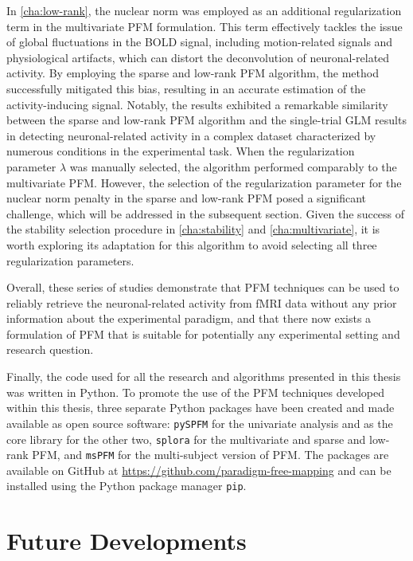 In \cref{cha:low-rank}, the nuclear norm was employed as an additional
regularization term in the multivariate PFM formulation. This term effectively
tackles the issue of global fluctuations in the BOLD signal, including
motion-related signals and physiological artifacts, which can distort the
deconvolution of neuronal-related activity. By employing the sparse and low-rank
PFM algorithm, the method successfully mitigated this bias, resulting in an
accurate estimation of the activity-inducing signal. Notably, the results
exhibited a remarkable similarity between the sparse and low-rank PFM algorithm
and the single-trial GLM results in detecting neuronal-related activity in a
complex dataset characterized by numerous conditions in the experimental task.
When the regularization parameter $\lambda$ was manually selected, the algorithm
performed comparably to the multivariate PFM. However, the selection of the
regularization parameter for the nuclear norm penalty in the sparse and low-rank
PFM posed a significant challenge, which will be addressed in the subsequent
section. Given the success of the stability selection procedure in
\cref{cha:stability} and \cref{cha:multivariate}, it is worth exploring its
adaptation for this algorithm to avoid selecting all three regularization
parameters.

Overall, these series of studies demonstrate that PFM techniques can be used to
reliably retrieve the neuronal-related activity from fMRI data without any prior
information about the experimental paradigm, and that there now exists a
formulation of PFM that is suitable for potentially any experimental setting and
research question.

Finally, the code used for all the research and algorithms presented in this
thesis was written in Python. To promote the use of the PFM techniques developed
within this thesis, three separate Python packages have been created and made
available as open source software: \texttt{pySPFM} for the univariate analysis
and as the core library for the other two, \texttt{splora} for the multivariate
and sparse and low-rank PFM, and \texttt{msPFM} for the multi-subject version of
PFM. The packages are available on GitHub at
\url{https://github.com/paradigm-free-mapping} and can be installed using the
Python package manager \texttt{pip}.

\section{Future Developments}

